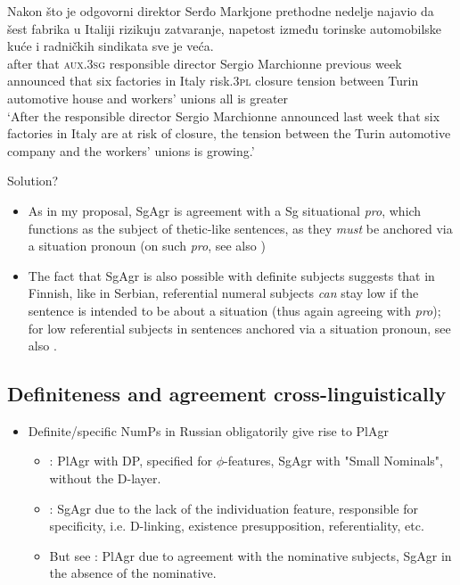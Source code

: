 \ea 
\gll Nakon što je odgovorni direktor Serđo Markjone prethodne nedelje najavio da šest fabrika u Italiji rizikuju zatvaranje, napetost između torinske automobilske kuće i radničkih sindikata sve je veća.\\
      after that \textsc{aux}.3\textsc{sg} responsible director Sergio Marchionne previous week announced that six factories in Italy risk.\textsc{3pl} closure tension between Turin automotive house and workers’ unions all is greater\\
\glt `After the responsible director Sergio Marchionne announced last week that six factories in Italy are at risk of closure, the tension between the Turin automotive company and the workers’ unions is growing.'
\z

Solution?
\begin{itemize}
    \item As in my proposal, SgAgr is agreement with a Sg situational \textit{pro}, which functions as the subject of thetic-like sentences, as they \textit{must} be anchored via a situation pronoun (on such \textit{pro}, see also \citealt{Erteschik-Shir1997, Basilico2003, Hinterholzl2019, Hinterholzl2024subjects, Hinterholzl2024es}) 
    \item The fact that SgAgr is also possible with definite subjects suggests that in Finnish, like in Serbian, referential numeral subjects \textit{can} stay low if the sentence is intended to be about a situation (thus again agreeing with \textit{pro}); for low referential subjects in sentences anchored via a situation pronoun, see also \citet{Hinterholzl2019, Hinterholzl2024es, Hinterholzl2024subjects}.
\end{itemize}

\subsection{{Definiteness and agreement cross-linguistically}}

\begin{itemize}
    \item Definite/specific NumPs in Russian obligatorily give rise to PlAgr \citep{Pereltsvaig2006, Matushansky2014, Matushansky2015a, Matushansky2015}
    \begin{itemize}
        \item \citet{Pereltsvaig2006}: PlAgr with DP, specified for $\phi$-features, SgAgr with "Small Nominals", without the D-layer.
        \item \citet{ Matushansky2014, Matushansky2015a, Matushansky2015}: SgAgr due to the lack of the individuation feature, responsible for specificity, i.e. D-linking, existence presupposition, referentiality, etc.
        \item But see \citet{Boskovic2008}: PlAgr due to agreement with the nominative subjects, SgAgr in the absence of the nominative.
    \end{itemize}
\end{itemize}

